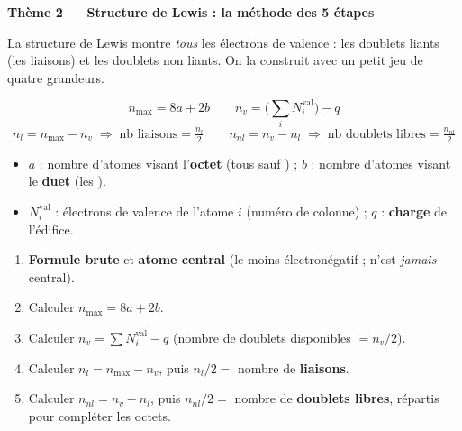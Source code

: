 \documentclass[11pt,a4paper]{article}
\begin{document}
\begin{center}
{\Large\bfseries\color{primarydark} Thème 2 — Structure de Lewis : la méthode des 5 étapes}
\end{center}

\smallskip
La structure de Lewis montre \emph{tous} les électrons de valence : les doublets liants (les
liaisons) et les doublets non liants. On la construit avec un petit jeu de quatre grandeurs.

\begin{cle}
\[ \boxed{n_{\max} = 8a + 2b} \qquad \boxed{n_{v} = \Big(\textstyle\sum_i N_i^{\text{val}}\Big) - q} \]
\[ \boxed{n_{l} = n_{\max} - n_{v}} \;\Rightarrow\; \text{nb liaisons} = \tfrac{n_l}{2}
   \qquad \boxed{n_{nl} = n_{v} - n_{l}} \;\Rightarrow\; \text{nb doublets libres} = \tfrac{n_{nl}}{2} \]
\begin{itemize}[leftmargin=1.5em,topsep=2pt,itemsep=1pt]
  \item $a$ : nombre d'atomes visant l'\textbf{octet} (tous sauf ) ; $b$ : nombre d'atomes
        visant le \textbf{duet} (les ).
  \item $N_i^{\text{val}}$ : électrons de valence de l'atome $i$ (numéro de colonne) ; $q$ :
        \textbf{charge} de l'édifice.
\end{itemize}
\end{cle}

\begin{methode}
\begin{enumerate}[leftmargin=1.9em,topsep=2pt,itemsep=1.5pt]
  \item \textbf{Formule brute} et \textbf{atome central} (le moins électronégatif ;  n'est
        \emph{jamais} central).
  \item Calculer $n_{\max} = 8a + 2b$.
  \item Calculer $n_{v} = \sum N_i^{\text{val}} - q$ \; (nombre de doublets disponibles $= n_v/2$).
  \item Calculer $n_{l} = n_{\max} - n_{v}$, puis $n_l/2 = $ nombre de \textbf{liaisons}.
  \item Calculer $n_{nl} = n_{v} - n_{l}$, puis $n_{nl}/2 = $ nombre de \textbf{doublets libres},
        répartis pour compléter les octets.
\end{enumerate}
\end{methode}
\end{document}
